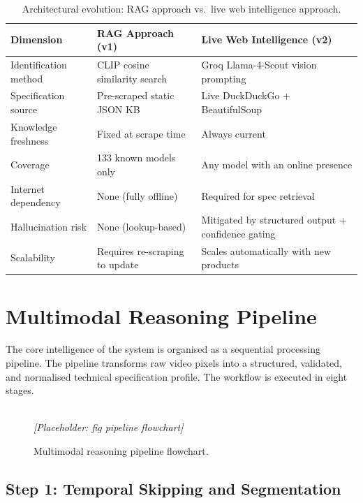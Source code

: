 \begin{table}[htbp]
\centering
\caption{Architectural evolution: RAG approach vs.\ live web intelligence approach.}
\label{tab:ch4-evolution}
\begin{tabular}{p{4cm} p{5cm} p{5cm}}
\toprule
\textbf{Dimension} & \textbf{RAG Approach (v1)} & \textbf{Live Web Intelligence (v2)} \\
\midrule
Identification method   & CLIP cosine similarity search  & Groq Llama-4-Scout vision prompting \\
Specification source    & Pre-scraped static JSON KB     & Live DuckDuckGo + BeautifulSoup \\
Knowledge freshness     & Fixed at scrape time           & Always current \\
Coverage                & 133 known models only          & Any model with an online presence \\
Internet dependency     & None (fully offline)           & Required for spec retrieval \\
Hallucination risk      & None (lookup-based)            & Mitigated by structured output + confidence gating \\
Scalability             & Requires re-scraping to update & Scales automatically with new products \\
\bottomrule
\end{tabular}
\end{table}

\section{Multimodal Reasoning Pipeline}
\label{sec:ch4-pipeline}

The core intelligence of the system is organised as a sequential processing pipeline. The pipeline transforms raw video pixels into a structured, validated, and normalised technical specification profile. The workflow is executed in eight stages.

\begin{figure}[htbp]
  \centering
  \framebox[\linewidth]{\rule{0pt}{4cm}}
  \\[4pt]
  {\small\textit{[Placeholder: fig pipeline flowchart]}}  
  
  \caption{Multimodal reasoning pipeline flowchart.}
  \label{fig:ch4-pipeline}
\end{figure}

\subsection{Step 1: Temporal Skipping and Segmentation}

